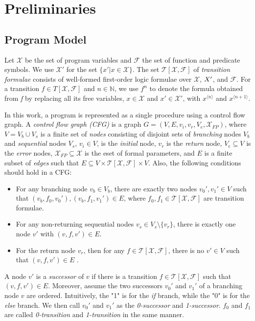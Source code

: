 
\chapter{Preliminaries}\label{ch:preliminaries}

\section{Program Model}\label{sec:model}

Let $\mathcal{X}$ be the set of program variables and $\mathcal{F}$ the set of function and predicate symbols. We use $\mathcal{X'}$ for the set $\{x'| x \in \mathcal{X}\}$. The set $\mathcal{T}[\mathcal{X}, \mathcal{F}]$ of \textit{transition formulae} consists of well-formed first-order logic formulae over $\mathcal{X}$, $\mathcal\mathcal{X'}$, and $\mathcal{F}$. For a transition $f \in {T}[\mathcal{X}, \mathcal{F}]$ and $\mathit{n} \in \mathbb{N}$, we use $f^{n}$ to denote the formula obtained from \textit{f} by replacing all its free variables, $x \in \mathcal{X}$ and $x' \in \mathcal{X'}$, with $x^{ \langle n \rangle }$ and $x^{\langle n+1 \rangle }$. 

In this work, a program is represented as a single procedure using a control flow graph. A \emph{control flow graph (CFG)} is a graph $G = (V, E, v_i, v_r, V_e, \mathcal{X}_{FP})$, where $V = V_b \cup V_s$ is a finite set of \emph{nodes} consisting of disjoint sets of \emph{branching} nodes $V_b$ and \emph{sequential} nodes $V_s$, $v_i \in V$, is the \emph{initial} node, $v_r$ is the \emph{return} node, $V_e \subseteq V$ is the \emph{error} nodes, $\mathcal{X}_{FP} \subseteq \mathcal{X}$ is the eset of formal parameters, and $E$ is a finite subset of \emph{edges} such that $E \subseteq V \times \mathcal{T[X,F]} \times V$. Also, the following conditions should hold in a CFG:
\begin{itemize}
	\item For any branching node $v_b \in V_b$, there are exactly two nodes $v_0' , v_1' \in V$ such that $(v_b, f_0, v_0'), (v_b, f_1, v_1') \in E$, where $f_0, f_1 \in \mathcal{T[X,F]}$ are transition formulae.
	
	\item For any non-returning sequential nodes $v_s \in V_s \setminus \{v_r\}$, there is exactly one node $v'$ with $(v, f, v') \in E$.
	
	\item For the return node $v_r$, then for any $f \in \mathcal{T[X,F]}$, there is no $v' \in V$ such that $(v, f, v') \in E$ .
\end{itemize}
A node $v'$ is a \emph{successor} of $v$ if there is a transition $f \in \mathcal{T[X,F]}$ such that $(v, f, v') \in E$. Moreover, assume the two successors $v_0'$ and $v_1'$ of a branching node $v$ are ordered. Intuitively, the "1" is for the \emph{if} branch, while the "0" is for the \emph{else} branch. We then call $v_0'$ and $v_1'$ as the \emph{0-successor} and \emph{1-successor}. $f_0$ and $f_1$ are called \emph{0-transition} and \emph{1-transition} in the same manner. 

